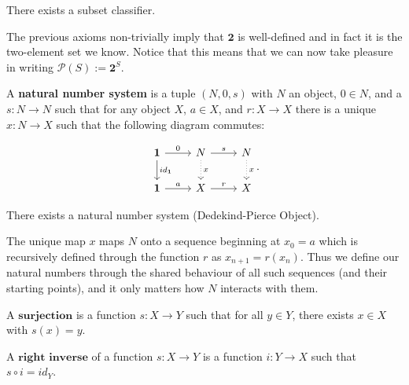 \begin{axiom}[Subsets]
There exists a subset classifier.
\end{axiom}

\begin{remark}
The previous axioms non-trivially imply that $\mathbf{2}$ is well-defined and in fact it is the two-element set we know. Notice that this means that we can now take pleasure in writing $\mathcal{P}(S) := \mathbf{2}^S$.
\end{remark}

\begin{definition}
A \textbf{natural number system} is a tuple $(N,0,s)$ with $N$ an object, $0 \in N$, and a $s: N \longrightarrow N$ such that for any object $X$, $a \in X$, and $r: X \longrightarrow X$
there is a unique $x: N \longrightarrow X$ such that the following diagram commutes:

\begin{equation*}
\begin{tikzcd}
\mathbf{1} \arrow[r, "0"] \arrow[d, "id_\mathbf{1}"]
& N \arrow[r, "s"] \arrow[d, "x", dotted]
& N \arrow[d, "x", dotted]   \\
\mathbf{1} \arrow[r, "a"]
& X \arrow[r, "r"]
& X
\end{tikzcd}.
\end{equation*}

\end{definition}

\begin{axiom}
There exists a natural number system (Dedekind-Pierce Object).
\end{axiom}

\begin{remark}
The unique map $x$ maps $N$ onto a sequence beginning at $x_0 = a$ which is recursively defined through the function $r$ as $x_{n+1} = r(x_n)$. Thus we define our natural numbers through the shared behaviour of all such sequences (and their starting points), and it only matters how $N$ interacts with them.
\end{remark}

\begin{definition}[$\dagger$]
A $\textbf{surjection}$ is a function $s: X \longrightarrow Y$ such that for all $y \in Y$, there exists $x \in X$ with $s(x) = y$.
\end{definition}

\begin{definition}[$\dagger$]
A $\textbf{right inverse}$ of a function $s: X \longrightarrow Y$ is a function $i: Y \longrightarrow X$ such that $s \circ i = id_Y$.
\end{definition}

